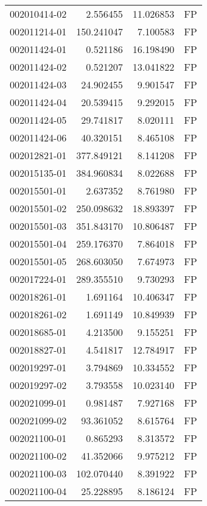 \begin{tabular}{lrrl}
002010414-02 &    2.556455 &      11.026853 &   FP \\
002011214-01 &  150.241047 &       7.100583 &   FP \\
002011424-01 &    0.521186 &      16.198490 &   FP \\
002011424-02 &    0.521207 &      13.041822 &   FP \\
002011424-03 &   24.902455 &       9.901547 &   FP \\
002011424-04 &   20.539415 &       9.292015 &   FP \\
002011424-05 &   29.741817 &       8.020111 &   FP \\
002011424-06 &   40.320151 &       8.465108 &   FP \\
002012821-01 &  377.849121 &       8.141208 &   FP \\
002015135-01 &  384.960834 &       8.022688 &   FP \\
002015501-01 &    2.637352 &       8.761980 &   FP \\
002015501-02 &  250.098632 &      18.893397 &   FP \\
002015501-03 &  351.843170 &      10.806487 &   FP \\
002015501-04 &  259.176370 &       7.864018 &   FP \\
002015501-05 &  268.603050 &       7.674973 &   FP \\
002017224-01 &  289.355510 &       9.730293 &   FP \\
002018261-01 &    1.691164 &      10.406347 &   FP \\
002018261-02 &    1.691149 &      10.849939 &   FP \\
002018685-01 &    4.213500 &       9.155251 &   FP \\
002018827-01 &    4.541817 &      12.784917 &   FP \\
002019297-01 &    3.794869 &      10.334552 &   FP \\
002019297-02 &    3.793558 &      10.023140 &   FP \\
002021099-01 &    0.981487 &       7.927168 &   FP \\
002021099-02 &   93.361052 &       8.615764 &   FP \\
002021100-01 &    0.865293 &       8.313572 &   FP \\
002021100-02 &   41.352066 &       9.975212 &   FP \\
002021100-03 &  102.070440 &       8.391922 &   FP \\
002021100-04 &   25.228895 &       8.186124 &   FP \\

\end{tabular}
